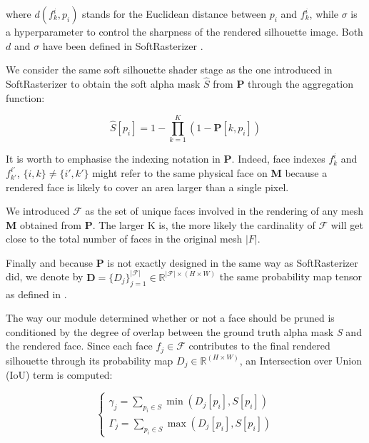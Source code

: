 where $d(f_{k}^{i},p_{i})$ stands for the Euclidean distance between $p_i$ and $f_{k}^{i}$, while $\sigma$ is a hyperparameter to control the sharpness of the rendered silhouette image. Both $d$ and $\sigma$ have been defined in SoftRasterizer \citep{liu2019soft}. \newline

We consider the same soft silhouette shader stage as the one introduced in SoftRasterizer to obtain the soft alpha mask $\hat{S}$ from $\mathbf{P}$ through the aggregation function:

\begin{equation}
    \hat{S}[p_i]=1 - \prod_{k=1}^{K} (1 - \mathbf{P}[k,p_{i}])
\end{equation}

It is worth to emphasise the indexing notation in $\mathbf{P}$. Indeed, face indexes $f_{k}^{i}$ and $f_{k'}^{i'}$, $\{i,k\} \neq \{i',k'\}$ might refer to the same physical face on \textbf{M} because a rendered face is likely to cover an area larger than a single pixel. 

We introduced $\mathcal{F}$ as the set of unique faces involved in the rendering of any mesh \textbf{M} obtained from $\mathbf{P}$. The larger K is, the more likely the cardinality of $\mathcal{F}$ will get close to the total number of faces in the original mesh $|F|$. 

Finally and because $\mathbf{P}$ is not exactly designed in the same way as SoftRasterizer did, we denote by $\mathbf{D}=\{D_{j}\}_{j=1}^{|\mathcal{F}|}\in \mathbb{R}^{|\mathcal{F}|\times(H\times W)}$ the same probability map tensor as defined in \citep{liu2019soft}.

The way our module determined whether or not a face should be pruned is conditioned by the degree of overlap between the ground truth alpha mask \textit{S} and the rendered face. Since each face $f_{j} \in \mathcal{F}$ contributes to the final rendered silhouette through its probability map $D_{j}\in \mathbb{R}^{(H\times W)}$, an Intersection over Union (IoU) term is computed: 

\begin{equation}
\begin{cases}
     \gamma_{j}=\sum_{p_{i}\in S} \min \left(  D_{j}[p_{i}] , S[p_{i}] \right) \\
     \Gamma_{j}=\sum_{p_{i}\in S} \max \left( D_{j}[p_{i}],S[p_{i}] \right)
\end{cases}
\end{equation}

